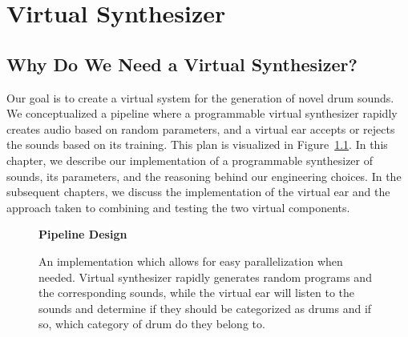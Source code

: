 \documentclass[\main/thesis.tex]{subfiles}
\begin{document}
\chapter{Virtual Synthesizer}
\section{Why Do We Need a Virtual Synthesizer?}
Our goal is to create a virtual system for the generation of novel drum sounds. We conceptualized a pipeline where a programmable virtual synthesizer rapidly creates audio based on random parameters, and a virtual ear accepts or rejects the sounds based on its training. This plan is visualized in  Figure~\ref{fig:pipeline_outline}. In this chapter, we describe our implementation of a programmable synthesizer of sounds, its parameters, and the reasoning behind our engineering choices. In the subsequent chapters, we discuss the implementation of the virtual ear and the approach taken to combining and testing the two virtual components. 
\label{vs}
 \begin{figure}[h!]
    \begin{center}
    \textbf{Pipeline Design}
    \end{center}
    \caption{An implementation which allows for easy parallelization when needed. Virtual synthesizer rapidly generates random programs and the corresponding sounds, while the virtual ear will listen to the sounds and determine if they should be categorized as drums and if so, which category of drum do they belong to. 
    }
\label{fig:pipeline_outline}
\end{figure}
\end{document}
